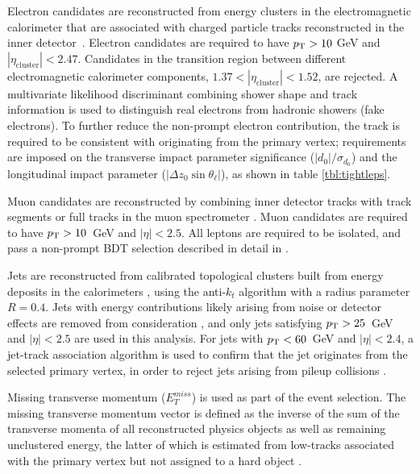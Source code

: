 Electron candidates are reconstructed from energy clusters in the electromagnetic calorimeter that are associated with charged particle tracks reconstructed in the inner detector~\cite{ATLAS-CONF-2016-024}.  Electron candidates are required to have $p_{\text{T}} > 10$ GeV and $|\eta_\textrm{cluster}| < 2.47$. Candidates in the transition region between different electromagnetic calorimeter components, $1.37 < |\eta_\textrm{cluster}| < 1.52$, are rejected. A multivariate likelihood discriminant combining shower shape and track information is used to distinguish real electrons from hadronic showers (fake electrons). To further reduce the non-prompt electron contribution, the track is required to be consistent with originating from the primary vertex; requirements are imposed on the transverse impact parameter significance ($|d_0|/\sigma_{d_0}$) and the longitudinal impact parameter ($|\Delta z_0 \sin \theta_\ell|$), as shown in table \ref{tbl:tightleps}.

Muon candidates are reconstructed by combining inner detector tracks with track segments or full tracks in the muon spectrometer \cite{PERF-2014-05}. Muon candidates are required to have $p_{\text{T}} > 10$~GeV and $|\eta| < 2.5$. All leptons are required to be isolated, and pass a non-prompt BDT selection described in detail in \cite{ttH_paper}.

Jets are reconstructed from calibrated topological clusters built from energy deposits in the calorimeters \cite{ATL-PHYS-PUB-2015-015}, using the anti-$k_t$ algorithm with a radius parameter $R=0.4$.  Jets with energy contributions likely arising from noise or detector effects are removed from consideration \cite{ATLAS-CONF-2015-029}, and only jets satisfying $p_{\text{T}} > 25$~GeV and $|\eta| < 2.5$ are used in this analysis.  For jets with $p_{\text{T}} < 60$~GeV and $|\eta| < 2.4$, a jet-track association algorithm is used to confirm that the jet originates from the selected primary vertex, in order to reject jets arising from pileup collisions \cite{PERF-2014-03}. 

Missing transverse momentum ($E_T^{miss}$) is used as part of the event selection. The missing transverse momentum vector is defined as the inverse of the sum of the transverse momenta of all reconstructed physics objects as well as remaining unclustered energy, the latter of which is estimated from low-\pt tracks associated with the primary vertex but not assigned to a hard object \cite{ATL-PHYS-PUB-2015-027}.
